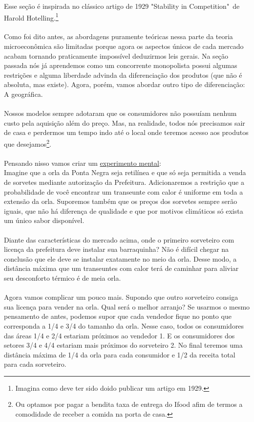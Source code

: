 \documentclass[a4paper,11pt,oneside]{book}
\theoremstyle{definition}
\theoremstyle{break}
\begin{document}
Esse seção é inspirada no clássico artigo de 1929 "Stability in Competition"\ de Harold Hotelling.\footnote{Imagina como deve ter sido doido publicar um artigo em 1929.}
\\
\\
Como foi dito antes, as abordagens puramente teóricas nessa parte da teoria microeconômica são limitadas porque agora os aspectos únicos de cada mercado acabam tornando praticamente impossível deduzirmos leis gerais. Na seção passada nós já aprendemos como um concorrente monopolista possui algumas restrições e alguma liberdade advinda da diferenciação dos produtos (que não é absoluta, mas existe). Agora, porém, vamos abordar outro tipo de diferenciação: A geográfica.
\\
\\
Nossos modelos sempre adotaram que os consumidores não possuíam nenhum custo pela aquisição além do preço. Mas, na realidade, todos nós precisamos sair de casa e perdermos um tempo indo até o local onde teremos acesso aos produtos que desejamos\footnote{Ou optamos por pagar a bendita taxa de entrega do Ifood afim de termos a comodidade de receber a comida na porta de casa.}.
\\
\\
Pensando nisso vamos criar um \href{https://en.wikipedia.org/wiki/Thought_experiment}{experimento mental}:
\\
Imagine que a orla da Ponta Negra seja retilínea e que só seja permitida a venda de sorvetes mediante autorização da Prefeitura. Adicionaremos a restrição que a probabilidade de você encontrar um transeunte com calor é uniforme em toda a extensão da orla. Suporemos também que os preços dos sorvetes sempre serão iguais, que não há diferença de qualidade e que por motivos climáticos só exista um único sabor disponível.
\\
\\
Diante das características do mercado acima, onde o primeiro sorveteiro com licença da prefeitura deve instalar sua barraquinha? Não é difícil chegar na conclusão que ele deve se instalar exatamente no meio da orla. Desse modo, a distância máxima que um transeuntes com calor terá de caminhar para aliviar seu desconforto térmico é de meia orla.
\\
\\
Agora vamos complicar um pouco mais. Supondo que outro sorveteiro consiga sua licença para vender na orla. Qual será o melhor arranjo? Se usarmos o mesmo pensamento de antes, podemos supor que cada vendedor fique no ponto que corresponda a 1/4 e 3/4 do tamanho da orla. Nesse caso, todos os consumidores das áreas 1/4 e 2/4 estariam próximos ao vendedor 1. E os consumidores dos setores 3/4 e 4/4 estariam mais próximos do sorveteiro 2. No final teremos uma distância máxima de 1/4 da orla para cada consumidor e 1/2 da receita total para cada sorveteiro.
\end{document}
